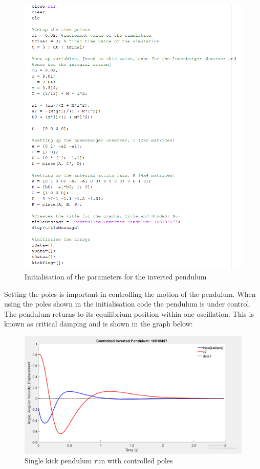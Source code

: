 \documentclass[11pt]{report}
\begin{document}
\begin{figure}[H]
\centerline{\includegraphics[width=12cm]{initMain.png}}
\caption{Initialisation of the parameters for the inverted pendulum}
\label{fig}
\end{figure} 

Setting the poles is important in controlling the motion of the pendulum. When using the poles shown in the initialisation code the pendulum is under control. The pendulum returns to its equilibrium position within one oscillation. This is known as critical damping and is shown in the graph below:

\begin{figure}[H]
\centerline{\includegraphics[width=12cm]{controlledPendulumOneKick.png}}
\caption{Single kick pendulum run with controlled poles}
\label{fig}
\end{figure}  
\end{document}
